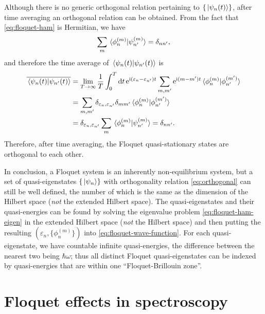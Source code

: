 \documentclass[hyperref, a4paper]{article}
\newcommand*{\ii}{\mathrm{i}}
\newcommand*{\ee}{\mathrm{e}}
\begin{document}
Although there is no generic orthogonal relation pertaining to $\{\ket*{\psi_n(t)}\}$,
after time averaging an orthogonal relation can be obtained.
From the fact that \eqref{eq:floquet-ham} is Hermitian, we have 
\begin{equation}
    \sum_m \braket*{\phi_n^{(m)}}{\psi_{n'}^{(m)}} = \delta_{nn'},
\end{equation}
and therefore the time average of $\braket*{\psi_n(t)}{\psi_{n'}(t)}$ is 
\begin{equation}
    \begin{aligned}
        \overline{\braket*{\psi_n(t)}{\psi_{n'}(t)}} &= 
        \lim_{T \to \infty} \frac{1}{T} \int_{0}^{T} \dd{t} 
        \ee^{\ii (\varepsilon_n - \varepsilon_{n'}) t}
        \sum_{m, m'}  \ee^{\ii (m - m') t}
        \braket*{\phi_n^{(m)}}{\phi_{n'}^{(m')}} \\
        &= \sum_{m, m'} \delta_{\varepsilon_n, \varepsilon_{n'}}
        \delta_{mm'} \braket*{\phi_n^{(m)}}{\phi_{n'}^{(m')}}  \\
        &= \delta_{\varepsilon_n, \varepsilon_{n'}} \sum_{m} \braket*{\phi_n^{(m)}}{\psi_{n'}^{(m)}}
        = \delta_{nn'}.
    \end{aligned}
    \label{eq:orthogonal}
\end{equation}
Therefore, after time averaging, the Floquet quasi-stationary states 
are orthogonal to each other.

In conclusion, a Floquet system is an inherently non-equilibrium system,
but a set of quasi-eigenstates $\{ \ket*{\psi_n} \}$
with orthogonality relation \eqref{eq:orthogonal} can still be well defined,
the number of which is the same as 
the dimension of the Hilbert space 
(\emph{not} the extended Hilbert space).
The quasi-eigenstates and their quasi-energies can be found by solving 
the eigenvalue problem \eqref{eq:floquet-ham-eigen} in the extended Hilbert space
(\emph{not} the Hilbert space) 
and then putting the resulting $(\varepsilon_n, \{\phi_n^{(m)}\})$
into \eqref{eq:floquet-wave-function}.
For each quasi-eigenstate,
we have countable infinite quasi-energies,
the difference between the nearest two being $\hbar \omega$;
thus all distinct Floquet quasi-eigenstates can be indexed 
by quasi-energies that are within one ``Floquet-Brillouin zone''.

\section{Floquet effects in spectroscopy}
\end{document}

